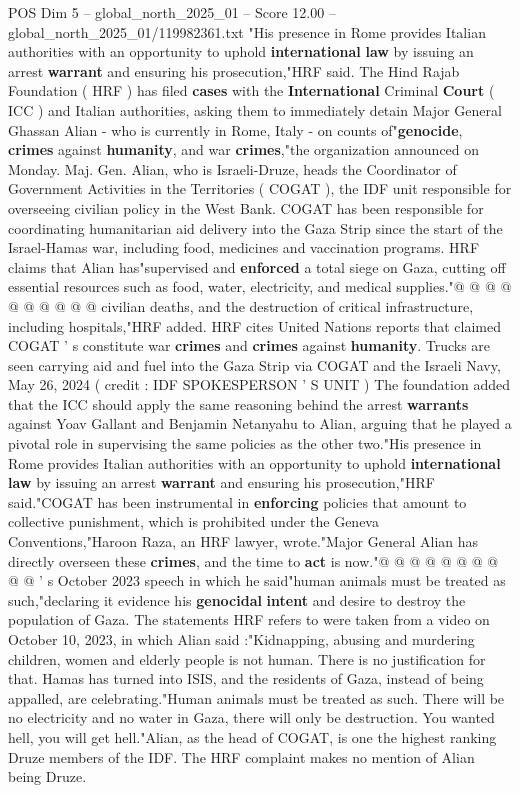 \begin{textsample}{POS Dim 5 – global\_north\_2025\_01 – Score 12.00 – global\_north\_2025\_01/119982361.txt}  \label{ex:f5_pos_387}
"His presence in Rome provides Italian authorities with an opportunity to uphold \textbf{international} \textbf{law} by issuing an arrest \textbf{warrant} and ensuring his prosecution,"HRF said.
The Hind Rajab Foundation ( HRF ) has filed \textbf{cases} with the \textbf{International} Criminal \textbf{Court} ( ICC ) and Italian authorities, asking them to immediately detain Major General Ghassan Alian - who is currently in Rome, Italy - on counts of"\textbf{genocide}, \textbf{crimes} against \textbf{humanity}, and war \textbf{crimes},"the organization announced on Monday.
Maj.
Gen.
Alian, who is Israeli-Druze, heads the Coordinator of Government Activities in the Territories ( COGAT ), the IDF unit responsible for overseeing civilian policy in the West Bank.
COGAT has been responsible for coordinating humanitarian aid delivery into the Gaza Strip since the start of the Israel-Hamas war, including food, medicines and vaccination programs.
HRF claims that Alian has"supervised and \textbf{enforced} a total siege on Gaza, cutting off essential resources such as food, water, electricity, and medical supplies."@ @ @ @ @ @ @ @ @ @ civilian deaths, and the destruction of critical infrastructure, including hospitals,"HRF added.
HRF cites United Nations reports that claimed COGAT ' s constitute war \textbf{crimes} and \textbf{crimes} against \textbf{humanity}.
Trucks are seen carrying aid and fuel into the Gaza Strip via COGAT and the Israeli Navy, May 26, 2024 ( credit : IDF SPOKESPERSON ' S UNIT ) The foundation added that the ICC should apply the same reasoning behind the arrest \textbf{warrants} against Yoav Gallant and Benjamin Netanyahu to Alian, arguing that he played a pivotal role in supervising the same policies as the other two."His presence in Rome provides Italian authorities with an opportunity to uphold \textbf{international} \textbf{law} by issuing an arrest \textbf{warrant} and ensuring his prosecution,"HRF said."COGAT has been instrumental in \textbf{enforcing} policies that amount to collective punishment, which is prohibited under the Geneva Conventions,"Haroon Raza, an HRF lawyer, wrote."Major General Alian has directly overseen these \textbf{crimes}, and the time to \textbf{act} is now."@ @ @ @ @ @ @ @ @ @ ' s October 2023 speech in which he said"human animals must be treated as such,"declaring it evidence his \textbf{genocidal} \textbf{intent} and desire to destroy the population of Gaza.
The statements HRF refers to were taken from a video on October 10, 2023, in which Alian said :"Kidnapping, abusing and murdering children, women and elderly people is not human.
There is no justification for that.
Hamas has turned into ISIS, and the residents of Gaza, instead of being appalled, are celebrating."Human animals must be treated as such.
There will be no electricity and no water in Gaza, there will only be destruction.
You wanted hell, you will get hell."Alian, as the head of COGAT, is one the highest ranking Druze members of the IDF.
The HRF complaint makes no mention of Alian being Druze.

\end{textsample}
